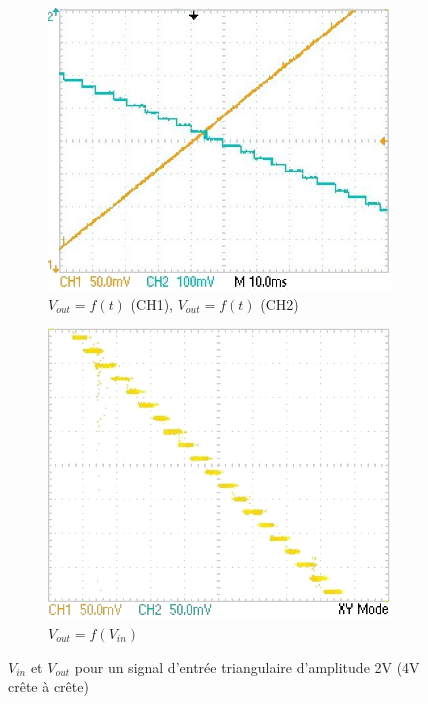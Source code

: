 \documentclass{article}
\begin{document}
\begin{figure}[h!]
  \centering
  \hfill
  \begin{subfigure}[b]{0.4\textwidth}
    \centering
    \includegraphics[width=\textwidth]{data/TEK0018_}
    \caption{$V_{out}=f(t)$ (CH1), $V_{out}=f(t)$ (CH2)}
    \label{fig:slowT}
  \end{subfigure}
  \hfill
  \begin{subfigure}[b]{0.4\textwidth}
    \centering
    \includegraphics[width=\textwidth]{data/TEK0017_}
    \caption{$V_{out}=f(V_{in})$}
    \label{fig:slowXY}
  \end{subfigure}
  \hfill
  \caption{$V_{in}$ et $V_{out}$ pour un signal d'entrée triangulaire d'amplitude 2V (4V crête à crête)}
  \label{fig:slow}
\end{figure}
\end{document}
